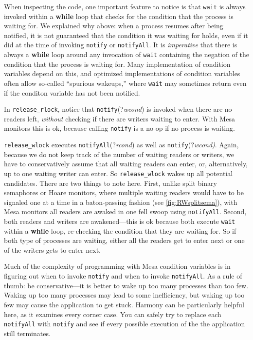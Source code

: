 \documentclass{report}
\begin{document}
When inspecting the code, one important feature to notice is that \texttt{wait} is always
invoked within a \textbf{while} loop that checks for the condition that the process is
waiting for.  We explained why above: when a process resumes after
being notified, it is not guaranteed that the condition it was waiting for holds, even
if it did at the time of invoking \texttt{notify} or \texttt{notifyAll}.
It is \emph{imperative} that there is always a \textbf{while} loop around any invocation
of \texttt{wait} containing the negation of the condition that the process is waiting for.
Many implementation of condition variables depend on this, and optimized implementations
of condition variables often allow so-called ``spurious wakeups,'' where \texttt{wait}
may sometimes return even if the conditon variable has not been notified.

In \texttt{release\_rlock}, notice that \texttt{notify}(?\textit{wcond}) is invoked when there
are no readers left, \emph{without} checking if there are writers waiting to enter.
With Mesa monitors this is ok, because calling \texttt{notify} is a no-op if no process
is waiting.

\texttt{release\_wlock} executes \texttt{notifyAll}(?\textit{rcond}) as well as
\texttt{notify}(?\textit{wcond)}.
Again, because we do not keep track of the number of waiting readers or writers, we
have to conservatively assume that all waiting readers can enter, or, alternatively,
up to one waiting writer can enter.  So \texttt{release\_wlock} wakes up all
potential candidates.
There are two things to note here.  First, unlike split binary semaphores or Hoare
monitors, where multiple waiting readers would have to be signaled one at a time in a
baton-passing fashion (see \autoref{fig:RWsplitsema}), with Mesa monitors
all readers are awaked in one fell swoop using \texttt{notifyAll}.
Second, both readers and writers are awakened---this is ok because both execute
\texttt{wait} within a \textbf{while} loop, re-checking the condition that they
are waiting for.  So if both type of processes are waiting, either all the readers
get to enter next or one of the writers gets to enter next.

Much of the complexity of programming with Mesa condition variables is in figuring out
when to invoke \texttt{notify} and when to invoke \texttt{notifyAll}.  As a rule of
thumb: be conservative---it is better to wake up too many processes than too few.
Waking up too many processes may lead to some inefficiency, but waking up too few
may cause the application to get stuck.  Harmony can be particularly helpful here, as
it examines every corner case.  You can safely try to replace each \texttt{notifyAll}
with \texttt{notify} and see if every possible execution of the the application still
terminates.
\end{document}
